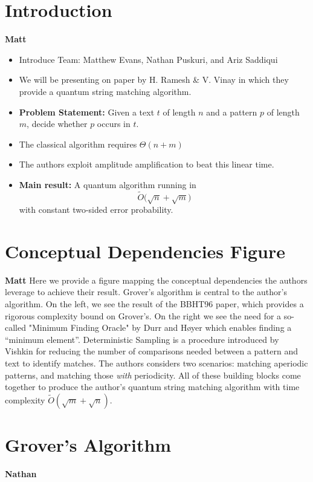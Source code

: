 \documentclass[11pt]{article}
\begin{document}
\section*{Introduction}
\textbf{Matt} \linebreak
\begin{itemize}
  \item Introduce Team: Matthew Evans, Nathan Puskuri, and Ariz Saddiqui
  \item We will be presenting on paper by H. Ramesh \& V. Vinay in which they provide a quantum string matching algorithm.
  \item \textbf{Problem Statement:} Given a text $t$ of length $n$ and a pattern $p$ of length $m$, decide whether $p$ occurs in $t$.
  \item The classical algorithm requires $\Theta(n + m)$
  \item The authors exploit amplitude amplification to beat this linear time.
  \item \textbf{Main result:} A quantum algorithm running in
        \[
          \widetilde{O}\bigl(\sqrt{n} + \sqrt{m}\bigr)
        \]
        with constant two-sided error probability.
\end{itemize}

\section*{Conceptual Dependencies Figure}
\textbf{Matt} \linebreak
Here we provide a figure mapping the conceptual dependencies the authors leverage to achieve their result.
Grover's algorithm is central to the author's algorithm. On the left, we see the result of the BBHT96 paper, which provides a rigorous complexity bound on Grover's. On the right we see the need for a so-called "Minimum Finding Oracle" by Durr and Høyer which enables finding a ``minimum element''. Deterministic Sampling is a procedure introduced by Vishkin for reducing the number of comparisons needed between a pattern and text to identify matches. The authors considers two scenarios: matching aperiodic patterns, and matching those \textit{with} periodicity.
All of these building blocks come together to produce the author's quantum string matching algorithm with time complexity \(\widetilde{O}(\sqrt{m} + \sqrt{n})\).

\section*{Grover's Algorithm}
\textbf{Nathan} \linebreak
\end{document}
